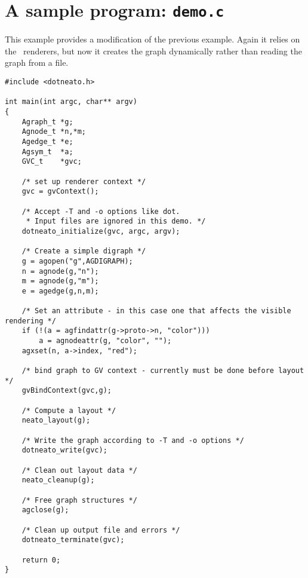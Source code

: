\section{A sample program: {\tt demo.c}}
\label{sec:demo}
This example provides a modification of the previous example. Again it
relies on the \gviz\ renderers, but now it creates the graph dynamically
rather than reading the graph from a file.   
\begin{verbatim}
#include <dotneato.h>

int main(int argc, char** argv)
{
    Agraph_t *g;
    Agnode_t *n,*m;
    Agedge_t *e;
    Agsym_t  *a;
    GVC_t    *gvc;

    /* set up renderer context */
    gvc = gvContext();

    /* Accept -T and -o options like dot.
     * Input files are ignored in this demo. */
    dotneato_initialize(gvc, argc, argv);

    /* Create a simple digraph */
    g = agopen("g",AGDIGRAPH);
    n = agnode(g,"n");
    m = agnode(g,"m");
    e = agedge(g,n,m);

    /* Set an attribute - in this case one that affects the visible rendering */
    if (!(a = agfindattr(g->proto->n, "color")))
        a = agnodeattr(g, "color", "");
    agxset(n, a->index, "red");

    /* bind graph to GV context - currently must be done before layout */
    gvBindContext(gvc,g);

    /* Compute a layout */
    neato_layout(g);

    /* Write the graph according to -T and -o options */
    dotneato_write(gvc);

    /* Clean out layout data */
    neato_cleanup(g);

    /* Free graph structures */
    agclose(g);

    /* Clean up output file and errors */
    dotneato_terminate(gvc);

    return 0;
}    
\end{verbatim}
